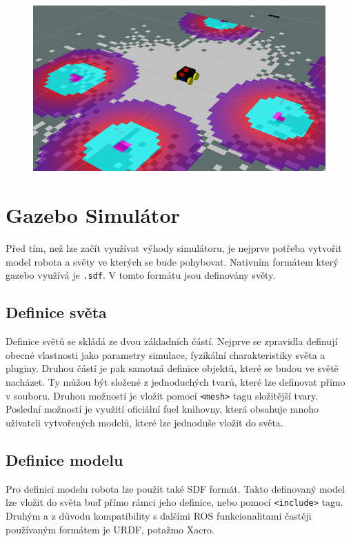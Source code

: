 \begin{figure}[h!]
	\centering
	\includegraphics[scale=0.4]{obrazky-figures/nav2.png}
	\caption{}
	\label{}
\end{figure}







\section{Gazebo Simulátor}


Před tím, než lze začít využívat výhody simulátoru, je nejprve potřeba vytvořit model robota a světy ve kterých se bude pohybovat. Nativním formátem který gazebo využívá je \verb|.sdf|. V tomto formátu jsou definovány světy.

\subsection*{Definice světa}
Definice světů se skládá ze dvou základních částí. Nejprve se zpravidla definují obecné vlastnosti jako parametry simulace, fyzikální charakteristiky světa a pluginy. Druhou částí je pak samotná definice objektů, které se budou ve světě nacházet. Ty můžou být složené z jednoduchých tvarů, které lze definovat přímo v souboru. Druhou možností je vložit pomocí \verb|<mesh>| tagu složitější tvary. Poslední možností je využití oficiální fuel knihovny, která obsahuje mnoho uživateli vytvořených modelů, které lze jednoduše vložit do světa.

\subsection*{Definice modelu}
Pro definici modelu robota lze použít také SDF formát. Takto definovaný model lze vložit do světa buď přímo rámci jeho definice, nebo pomocí \verb|<include>| tagu. Druhým a z důvodu kompatibility s dalšími ROS funkcionalitami častěji používaným formátem je URDF, potažmo Xacro. 

